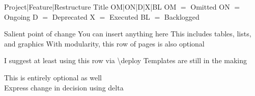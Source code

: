 \documentclass{article}
\begin{document}
\frontmatter
{Project|Feature|Restructure} 
{Title}
{OM|ON|D|X|BL}
{\hfill OM $=$ Omitted \hfill ON $=$ Ongoing \hfill D $=$ Deprecated \hfill X $=$ Executed \hfill BL $=$ Backlogged}

\strategy
{Salient point of change}
{You can insert anything here}
{This includes tables, lists, and graphics}
{With modularity, this row of pages is also optional}

\deploy
{I suggest at least using this row via {\textbackslash}deploy}
{Templates are still in the making}

\report
{This is entirely optional as well\\Express change in decision using {\Delta}delta}
\end{document}
